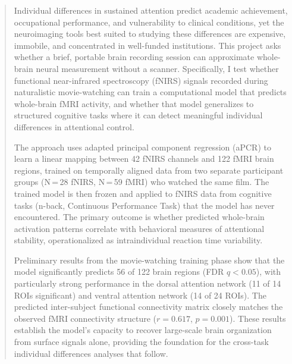 

\begin{abstract}

Individual differences in sustained attention predict academic achievement, occupational performance, and vulnerability to clinical conditions, yet the neuroimaging tools best suited to studying these differences are expensive, immobile, and concentrated in well-funded institutions. This project asks whether a brief, portable brain recording session can approximate whole-brain neural measurement without a scanner. Specifically, I test whether functional near-infrared spectroscopy (fNIRS) signals recorded during naturalistic movie-watching can train a computational model that predicts whole-brain fMRI activity, and whether that model generalizes to structured cognitive tasks where it can detect meaningful individual differences in attentional control.

The approach uses adapted principal component regression (aPCR) to learn a linear mapping between 42 fNIRS channels and 122 fMRI brain regions, trained on temporally aligned data from two separate participant groups (N\,=\,28 fNIRS, N\,=\,59 fMRI) who watched the same film. The trained model is then frozen and applied to fNIRS data from cognitive tasks (n-back, Continuous Performance Task) that the model has never encountered. The primary outcome is whether predicted whole-brain activation patterns correlate with behavioral measures of attentional stability, operationalized as intraindividual reaction time variability.

Preliminary results from the movie-watching training phase show that the model significantly predicts 56 of 122 brain regions (FDR $q < 0.05$), with particularly strong performance in the dorsal attention network (11 of 14 ROIs significant) and ventral attention network (14 of 24 ROIs). The predicted inter-subject functional connectivity matrix closely matches the observed fMRI connectivity structure ($r = 0.617$, $p = 0.001$). These results establish the model's capacity to recover large-scale brain organization from surface signals alone, providing the foundation for the cross-task individual differences analyses that follow.

\end{abstract}
